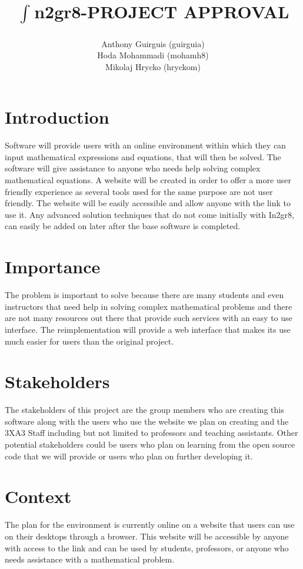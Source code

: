 \documentclass[12pt,fleqn]{article}
\title{$\int_{}^{}$n2gr8-PROJECT APPROVAL}
\author{Anthony Guirguis (guirguia) \\ Hoda Mohammadi (mohamh8) \\ Mikolaj Hrycko (hryckom)}
\begin{document}
\maketitle
\newpage

\section *{Introduction}		
Software will provide users with an online environment within which they can input mathematical expressions and equations, that will then be solved. The software will give assistance to anyone who needs help solving complex mathematical equations. A website will be created in order to offer a more user friendly experience as several tools used for the same purpose are not user friendly. The website will be easily accessible and allow anyone with the link to use it. Any advanced solution techniques that do not come initially with In2gr8, can easily be added on later after the base software is completed.

\section *{Importance} 
The problem is important to solve because there are many students and even instructors that need help in solving complex mathematical problems and there are not many resources out there that provide such services with an easy to use interface. The reimplementation will provide a web interface that makes its use much easier for users than the original project.

\section *{Stakeholders}	
The stakeholders of this project are the group members who are creating this software along with the users who use the website we plan on creating and the 3XA3 Staff including but not limited to professors and teaching assistants. Other potential stakeholders could be users who plan on learning from the open source code that we will provide or users who plan on further developing it.


\section *{Context} 
The plan for the environment is currently online on a website that users can use on their desktops through a browser. This website will be accessible by anyone with access to the link and can be used by students, professors, or anyone who needs assistance with a mathematical problem.
\end{document}
